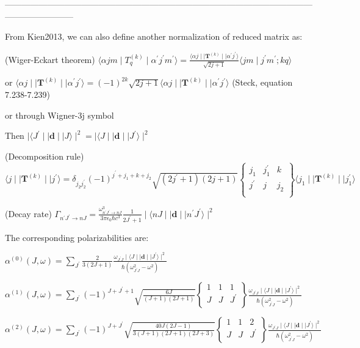 \documentclass{article}
\begin{document}
------------------------------------------------------------------------------------------------------------------------------------

From Kien2013, we can also define another normalization of reduced matrix as:

(Wiger-Eckart theorem) $\langle \alpha j m \mid  T_q^{(k)} \mid \alpha^{'} j^{'} m^{'} \rangle = \frac{ \langle \alpha j  \mid \mid \textbf{T}^{(k)} \mid \mid \alpha^{'} j^{'}  \rangle }{\sqrt{2 j + 1}}\langle jm \mid j^{'} m^{'}; k q \rangle$

or $\langle \alpha j  \mid \mid \textbf{T}^{(k)} \mid \mid \alpha^{'} j^{'}  \rangle = (-1)^{2k} \sqrt{2j + 1}\langle \alpha j  \mid \mid \textbf{T}^{(k)} \mid \mid \alpha^{'} j^{'}  \rangle$ (Steck, equation 7.238-7.239)

or through Wigner-3j symbol

Then $\mid \langle J^{'} \mid\mid \textbf{d} \mid \mid J \rangle \mid^2 =  \mid \langle J \mid\mid \textbf{d} \mid \mid J^{'} \rangle \mid^2 $

(Decomposition rule) $\langle  j  \mid \mid \textbf{T}^{(k)} \mid \mid j^{'}  \rangle = \delta_{j_2 j_2^{'}} (-1)^{j^{'} + j_1 + k + j_{2}} \sqrt{(2j^{'} + 1)(2 j + 1)}  \begin{Bmatrix}
j_{1} & j_{1}^{'} & k \\
j^{'} & j  & j_{2} \\ \end{Bmatrix} \langle  j_1  \mid \mid \textbf{T}^{(k)} \mid \mid j_1^{'}  \rangle$

(Decay rate) $\Gamma_{n^{'} J^{'} \rightarrow nJ} = \frac{\omega_{n^{'} J^{'} \rightarrow nJ}^3}{3 \pi \epsilon_0 \hbar c^3} \frac{1}{2 J^{'} + 1} \mid \langle nJ \mid \mid \textbf{d} \mid \mid n^{'} J^{'} \rangle \mid^2$


The corresponding polarizabilities are:

$\alpha^{(0)}(J, \omega) = \sum_{J^{'}} \frac{2}{3(2J +1)}\frac{ \omega_{J^{'} J} \mid \langle J \mid\mid \textbf{d} \mid \mid J^{'} \rangle \mid^2}{ \hbar (\omega_{J^{'} J}^2 - \omega^2)}$

$\alpha^{(1)}(J, \omega) = \sum_{J^{'}}(-1)^{J + J^{'} + 1} \sqrt{\frac{6J}{(J+1)(2J + 1)}} \begin{Bmatrix}
1 & 1 & 1 \\
J & J  & J^{'} \\ \end{Bmatrix}  \frac{ \omega_{J^{'} J} \mid \langle J \mid\mid \textbf{d} \mid \mid J^{'} \rangle \mid^2}{\hbar (\omega_{J^{'} J}^2 - \omega^2)}$

$\alpha^{(2)}(J, \omega) = \sum_{J^{'}}(-1)^{J + J^{'}} \sqrt{\frac{40J(2J-1)}{3(J+1)(2J + 1)(2J+3)}} \begin{Bmatrix}
1 & 1 & 2 \\
J & J  & J^{'} \\ \end{Bmatrix}  \frac{ \omega_{J^{'} J} \mid \langle J \mid\mid \textbf{d} \mid \mid J^{'} \rangle \mid^2}{\hbar (\omega_{J^{'} J}^2 - \omega^2)}$
    
    
    
    
\end{document}
